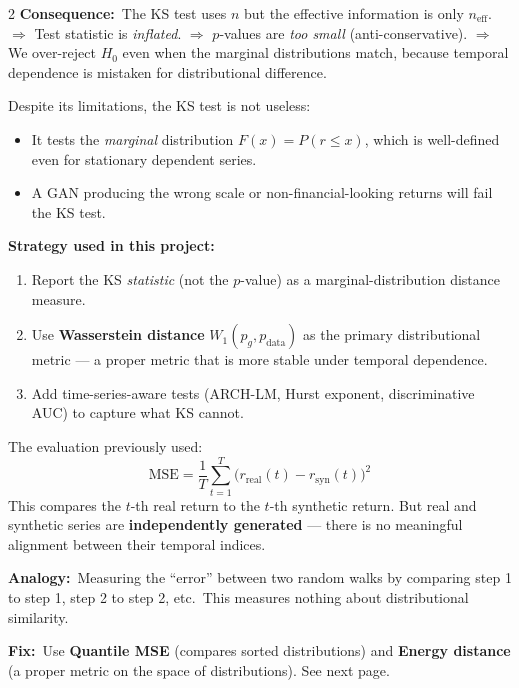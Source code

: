 \documentclass[10pt]{article}
\newcommand{\amberbox}[2]{\begin{tcolorbox}[mybox={Amber}{ABg},title={#1}]#2\end{tcolorbox}}
\newcommand{\redbox}[2]{\begin{tcolorbox}[mybox={DRed}{RBg},title={#1}]#2\end{tcolorbox}}
\begin{document}
\begin{multicols}{2}
{\textbf{Consequence:}\ The KS test uses $n$ but the effective information is only $n_\text{eff}$.
$\Rightarrow$ Test statistic is \emph{inflated}.
$\Rightarrow$ $p$-values are \emph{too small} (anti-conservative).
$\Rightarrow$ We over-reject $H_0$ even when the marginal distributions match, because temporal dependence is mistaken for distributional difference.}

\columnbreak

\amberbox{What Can the KS Test Still Tell Us?}{%
Despite its limitations, the KS test is not useless:
\begin{itemize}
  \item It tests the \emph{marginal} distribution $F(x) = P(r \leq x)$, which is well-defined even for stationary dependent series.
  \item A GAN producing the wrong scale or non-financial-looking returns will fail the KS test.
\end{itemize}

\textbf{Strategy used in this project:}
\begin{enumerate}
  \item Report the KS \emph{statistic} (not the $p$-value) as a marginal-distribution distance measure.
  \item Use \textbf{Wasserstein distance} $W_1(p_g, p_\text{data})$ as the primary distributional metric --- a proper metric that is more stable under temporal dependence.
  \item Add time-series-aware tests (ARCH-LM, Hurst exponent, discriminative AUC) to capture what KS cannot.
\end{enumerate}}

\redbox{Why Pointwise MSE/MAE Are Wrong}{%
The evaluation previously used:
\begin{equation*}
  \text{MSE} = \frac{1}{T}\sum_{t=1}^T \bigl(r_\text{real}(t) - r_\text{syn}(t)\bigr)^2
\end{equation*}
This compares the $t$-th real return to the $t$-th synthetic return. But real and synthetic series are \textbf{independently generated} --- there is no meaningful alignment between their temporal indices.

\textbf{Analogy:}\ Measuring the ``error'' between two random walks by comparing step 1 to step 1, step 2 to step 2, etc.\ This measures nothing about distributional similarity.

\textbf{Fix:}\ Use \textbf{Quantile MSE} (compares sorted distributions) and \textbf{Energy distance} (a proper metric on the space of distributions). See next page.}


\end{multicols}
\end{document}
